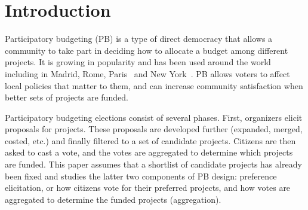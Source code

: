 \documentclass[letterpaper]{article} %
\newcommand{\kibitz}[2]{\ifnum\Comments=1{\color{#1}{#2}}\fi}
\newcommand{\kg}[1]{\kibitz{red}{[Kobi says:#1]}}
\begin{document}

\section{Introduction}\label{sec:intro}

Participatory budgeting (PB) is a type of direct democracy that allows a community to take part in deciding how to allocate a budget among different projects. It is growing in popularity and has been used around the world including in Madrid, Rome, Paris~\citep{sintomer2008participatory} and New York~\citep{su2017porto}.  
PB allows voters to affect local policies that matter to them, and  can increase community satisfaction when  better sets of projects are funded. \kg{does there exist work on satisfaction of public?}


Participatory budgeting elections consist of several phases. First, organizers elicit proposals for  projects. These proposals are developed further (expanded, merged, costed, etc.) and finally filtered to a set of candidate projects.  Citizens are then asked to cast a vote, and the votes are aggregated to determine which projects are funded. 
This paper assumes that a shortlist of candidate projects has already been fixed and studies the latter two components  of PB design: preference elicitation, or
how citizens vote  for their preferred projects,  and how votes are aggregated to determine the funded projects (aggregation). 
 
\end{document}
